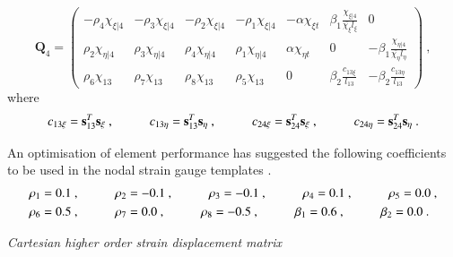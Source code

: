 \begin{equation} 
\mathbf{Q}_4 =
\begin{pmatrix}
-\rho_4 \chi_{\xi | 4} & -\rho_3 \chi_{\xi | 4} & -\rho_2 \chi_{\xi | 4} & -\rho_1 \chi_{\xi | 4} & -\alpha \chi_{\xi t} & \beta_1 \frac{\chi_{\xi | 4}}{\bar{\chi_\xi} l_\xi} & 0  \\	
\rho_2 \chi_{\eta | 4} & \rho_3 \chi_{\eta | 4} & \rho_4 \chi_{\eta | 4} & \rho_1 \chi_{\eta | 4} & \alpha \chi_{\eta t} & 0 & -\beta_1 \frac{\chi_{\eta | 4}}{\bar{\chi_\eta} l_\eta} \\
\rho_6 \chi_{13} & \rho_7 \chi_{13} & \rho_8 \chi_{13} & \rho_5 \chi_{13} & 0 & \beta_2 \frac{c_{13 \xi}}{l_{13}} & -\beta_2 \frac{c_{13 \eta}}{l_{13}}
\end{pmatrix}		
\label{equation15}\ ,
\end{equation}
where
\begin{align*} 
	c_{13 \xi} = \mathbf{s}_{13}^T \mathbf{s_\xi}\ ,
	\hspace{10mm}
	c_{13 \eta} = \mathbf{s}_{13}^T \mathbf{s_\eta}\ ,
	\hspace{10mm}
	c_{24 \xi} = \mathbf{s}_{24}^T \mathbf{s_\xi}\ ,
	\hspace{10mm}
	c_{24 \eta} = \mathbf{s}_{24}^T \mathbf{s_\eta}
	\ .
\end{align*}

An optimisation of element performance has suggested the following coefficients to be used in the nodal strain gauge templates \cite{Hau94}. 
\begin{gather} 
	\begin{aligned}
		&\rho_1 = 0.1\ ,
		\hspace{10mm}
		\rho_2 = -0.1\ ,
		\hspace{10mm}
		\rho_3 = -0.1\ ,
		\hspace{10mm}
		\rho_4 = 0.1\ ,
		\hspace{10mm}
		\rho_5 = 0.0\ , \\
		&\rho_6 = 0.5\ ,
		\hspace{10mm}
		\rho_7 = 0.0\ ,
		\hspace{10mm}
		\rho_8 = -0.5\ ,
		\hspace{10mm}
		\beta_1 = 0.6\ ,
		\hspace{10mm}
		\beta_2 = 0.0\ .
		\label{equation16}
	\end{aligned}
\end{gather}

\textit{Cartesian higher order strain displacement matrix}

